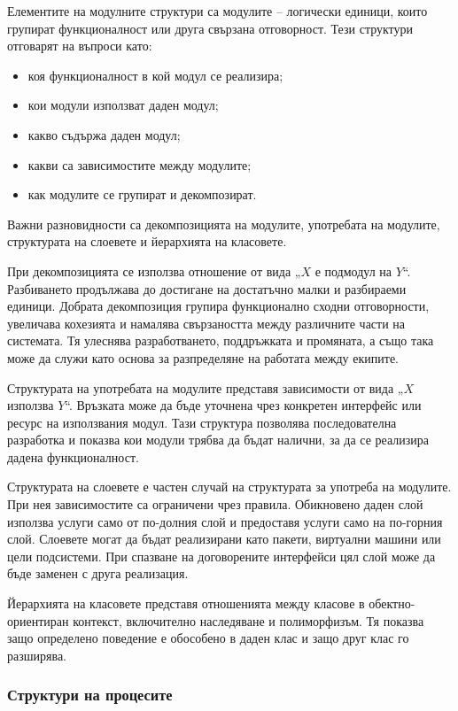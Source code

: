Елементите на модулните структури са модулите -- логически единици, които групират функционалност или друга свързана отговорност. Тези структури отговарят на въпроси като:

\begin{itemize}
    \item коя функционалност в кой модул се реализира;
    \item кои модули използват даден модул;
    \item какво съдържа даден модул;
    \item какви са зависимостите между модулите;
    \item как модулите се групират и декомпозират.
\end{itemize}

Важни разновидности са декомпозицията на модулите, употребата на модулите, структурата на слоевете и йерархията на класовете.

При декомпозицията се използва отношение от вида „$X$ е подмодул на $Y$“. Разбиването продължава до достигане на достатъчно малки и разбираеми единици. Добрата декомпозиция групира функционално сходни отговорности, увеличава кохезията и намалява свързаността между различните части на системата. Тя улеснява разработването, поддръжката и промяната, а също така може да служи като основа за разпределяне на работата между екипите.

Структурата на употребата на модулите представя зависимости от вида „$X$ използва $Y$“. Връзката може да бъде уточнена чрез конкретен интерфейс или ресурс на използвания модул. Тази структура позволява последователна разработка и показва кои модули трябва да бъдат налични, за да се реализира дадена функционалност.

Структурата на слоевете е частен случай на структурата за употреба на модулите. При нея зависимостите са ограничени чрез правила. Обикновено даден слой използва услуги само от по-долния слой и предоставя услуги само на по-горния слой. Слоевете могат да бъдат реализирани като пакети, виртуални машини или цели подсистеми. При спазване на договорените интерфейси цял слой може да бъде заменен с друга реализация.

Йерархията на класовете представя отношенията между класове в обектно-ориентиран контекст, включително наследяване и полиморфизъм. Тя показва защо определено поведение е обособено в даден клас и защо друг клас го разширява.

\subsubsection{Структури на процесите}

